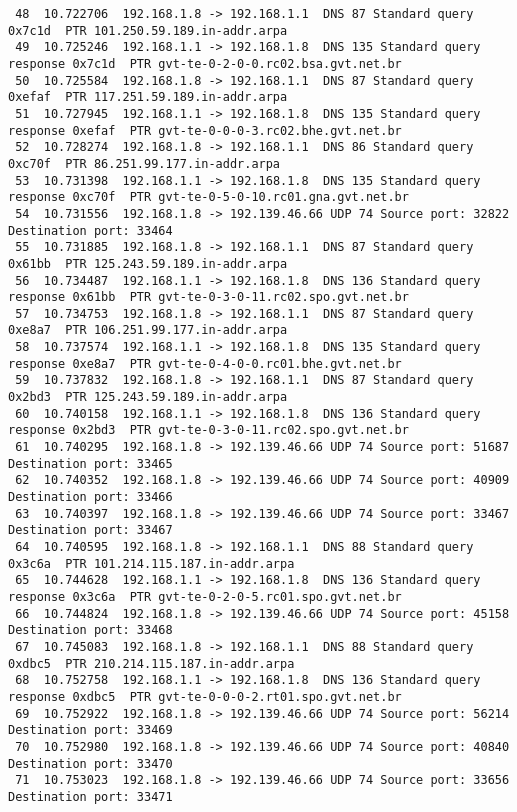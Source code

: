 \documentclass[a4paper]{report} %
\begin{document}
\begin{lstlisting}
 48  10.722706  192.168.1.8 -> 192.168.1.1  DNS 87 Standard query 0x7c1d  PTR 101.250.59.189.in-addr.arpa
 49  10.725246  192.168.1.1 -> 192.168.1.8  DNS 135 Standard query response 0x7c1d  PTR gvt-te-0-2-0-0.rc02.bsa.gvt.net.br
 50  10.725584  192.168.1.8 -> 192.168.1.1  DNS 87 Standard query 0xefaf  PTR 117.251.59.189.in-addr.arpa
 51  10.727945  192.168.1.1 -> 192.168.1.8  DNS 135 Standard query response 0xefaf  PTR gvt-te-0-0-0-3.rc02.bhe.gvt.net.br
 52  10.728274  192.168.1.8 -> 192.168.1.1  DNS 86 Standard query 0xc70f  PTR 86.251.99.177.in-addr.arpa
 53  10.731398  192.168.1.1 -> 192.168.1.8  DNS 135 Standard query response 0xc70f  PTR gvt-te-0-5-0-10.rc01.gna.gvt.net.br
 54  10.731556  192.168.1.8 -> 192.139.46.66 UDP 74 Source port: 32822  Destination port: 33464
 55  10.731885  192.168.1.8 -> 192.168.1.1  DNS 87 Standard query 0x61bb  PTR 125.243.59.189.in-addr.arpa
 56  10.734487  192.168.1.1 -> 192.168.1.8  DNS 136 Standard query response 0x61bb  PTR gvt-te-0-3-0-11.rc02.spo.gvt.net.br
 57  10.734753  192.168.1.8 -> 192.168.1.1  DNS 87 Standard query 0xe8a7  PTR 106.251.99.177.in-addr.arpa
 58  10.737574  192.168.1.1 -> 192.168.1.8  DNS 135 Standard query response 0xe8a7  PTR gvt-te-0-4-0-0.rc01.bhe.gvt.net.br
 59  10.737832  192.168.1.8 -> 192.168.1.1  DNS 87 Standard query 0x2bd3  PTR 125.243.59.189.in-addr.arpa
 60  10.740158  192.168.1.1 -> 192.168.1.8  DNS 136 Standard query response 0x2bd3  PTR gvt-te-0-3-0-11.rc02.spo.gvt.net.br
 61  10.740295  192.168.1.8 -> 192.139.46.66 UDP 74 Source port: 51687  Destination port: 33465
 62  10.740352  192.168.1.8 -> 192.139.46.66 UDP 74 Source port: 40909  Destination port: 33466
 63  10.740397  192.168.1.8 -> 192.139.46.66 UDP 74 Source port: 33467  Destination port: 33467
 64  10.740595  192.168.1.8 -> 192.168.1.1  DNS 88 Standard query 0x3c6a  PTR 101.214.115.187.in-addr.arpa
 65  10.744628  192.168.1.1 -> 192.168.1.8  DNS 136 Standard query response 0x3c6a  PTR gvt-te-0-2-0-5.rc01.spo.gvt.net.br
 66  10.744824  192.168.1.8 -> 192.139.46.66 UDP 74 Source port: 45158  Destination port: 33468
 67  10.745083  192.168.1.8 -> 192.168.1.1  DNS 88 Standard query 0xdbc5  PTR 210.214.115.187.in-addr.arpa
 68  10.752758  192.168.1.1 -> 192.168.1.8  DNS 136 Standard query response 0xdbc5  PTR gvt-te-0-0-0-2.rt01.spo.gvt.net.br
 69  10.752922  192.168.1.8 -> 192.139.46.66 UDP 74 Source port: 56214  Destination port: 33469
 70  10.752980  192.168.1.8 -> 192.139.46.66 UDP 74 Source port: 40840  Destination port: 33470
 71  10.753023  192.168.1.8 -> 192.139.46.66 UDP 74 Source port: 33656  Destination port: 33471

\end{lstlisting}
\end{document}
